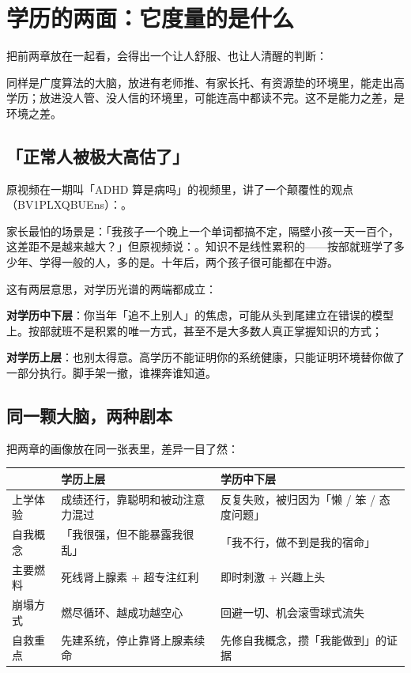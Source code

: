 \section{学历的两面：它度量的是什么}

把前两章放在一起看，会得出一个让人舒服、也让人清醒的判断：


同样是广度算法的大脑，放进有老师推、有家长托、有资源垫的环境里，能走出高学历；放进没人管、没人信的环境里，可能连高中都读不完。这不是能力之差，是环境之差。

\subsection{「正常人被极大高估了」}

原视频在一期叫「ADHD 算是病吗」的视频里，讲了一个颠覆性的观点（BV1PLXQBUEns）：。

家长最怕的场景是：「我孩子一个晚上一个单词都搞不定，隔壁小孩一天一百个，这差距不是越来越大？」但原视频说：。知识不是线性累积的——按部就班学了多少年、学得一般的人，多的是。十年后，两个孩子很可能都在中游。

这有两层意思，对学历光谱的两端都成立：

\begin{checklist}
  \item \textbf{对学历中下层}：你当年「追不上别人」的焦虑，可能从头到尾建立在错误的模型上。按部就班不是积累的唯一方式，甚至不是大多数人真正掌握知识的方式；
  \item \textbf{对学历上层}：也别太得意。高学历不能证明你的系统健康，只能证明环境替你做了一部分执行。脚手架一撤，谁裸奔谁知道。
\end{checklist}

\subsection{同一颗大脑，两种剧本}

把两章的画像放在同一张表里，差异一目了然：

\begin{table}[h]
\centering\small
\begin{tabular}{>{\raggedright\arraybackslash}p{2.6cm} p{6.1cm} p{6.1cm}}
\toprule
 & \textbf{学历上层} & \textbf{学历中下层} \\
\midrule
上学体验 & 成绩还行，靠聪明和被动注意力混过 & 反复失败，被归因为「懒 / 笨 / 态度问题」 \\
自我概念 & 「我很强，但不能暴露我很乱」 & 「我不行，做不到是我的宿命」 \\
主要燃料 & 死线肾上腺素 + 超专注红利 & 即时刺激 + 兴趣上头 \\
崩塌方式 & 燃尽循环、越成功越空心 & 回避一切、机会滚雪球式流失 \\
自救重点 & 先建系统，停止靠肾上腺素续命 & 先修自我概念，攒「我能做到」的证据 \\
\bottomrule
\end{tabular}
\end{table}

